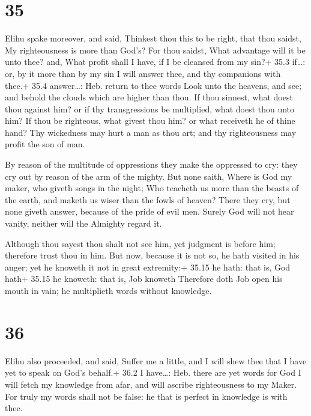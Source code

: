 \hypertarget{section-34}{%
\section{35}\label{section-34}}

 Elihu spake moreover, and said,  Thinkest thou
this to be right, that thou saidst, My righteousness is more than God's?
 For thou saidst, What advantage will it be unto thee? and,
What profit shall I have, if I be cleansed from my sin?+ 35.3 if\ldots:
or, by it more than by my sin  I will answer thee, and thy
companions with thee.+ 35.4 answer\ldots: Heb. return to thee words
 Look unto the heavens, and see; and behold the clouds which
are higher than thou.  If thou sinnest, what doest thou
against him? or if thy transgressions be multiplied, what doest thou
unto him?  If thou be righteous, what givest thou him? or
what receiveth he of thine hand?  Thy wickedness may hurt a
man as thou art; and thy righteousness may profit the son of man.

 By reason of the multitude of oppressions they make the
oppressed to cry: they cry out by reason of the arm of the mighty.
 But none saith, Where is God my maker, who giveth songs in
the night;  Who teacheth us more than the beasts of the
earth, and maketh us wiser than the fowls of heaven?  There
they cry, but none giveth answer, because of the pride of evil men.
 Surely God will not hear vanity, neither will the Almighty
regard it.

 Although thou sayest thou shalt not see him, yet judgment
is before him; therefore trust thou in him.  But now,
because it is not so, he hath visited in his anger; yet he knoweth it
not in great extremity:+ 35.15 he hath: that is, God hath+ 35.15 he
knoweth: that is, Job knoweth  Therefore doth Job open his
mouth in vain; he multiplieth words without knowledge.

\hypertarget{section-35}{%
\section{36}\label{section-35}}

 Elihu also proceeded, and said,  Suffer me a
little, and I will shew thee that I have yet to speak on God's behalf.+
36.2 I have\ldots: Heb. there are yet words for God  I will
fetch my knowledge from afar, and will ascribe righteousness to my
Maker.  For truly my words shall not be false: he that is
perfect in knowledge is with thee.

